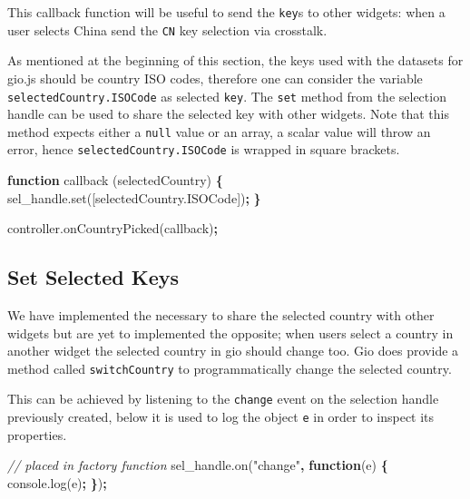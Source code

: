 \documentclass[
]{krantz}
\makeatletter
\newenvironment{Shaded}{\begin{snugshade}}{\end{snugshade}}
\newcommand{\AttributeTok}[1]{\textcolor[rgb]{0.61,0.61,0.61}{#1}}
\newcommand{\CommentTok}[1]{\textcolor[rgb]{0.37,0.37,0.37}{\textit{#1}}}
\newcommand{\KeywordTok}[1]{\textcolor[rgb]{0.27,0.27,0.27}{\textbf{#1}}}
\newcommand{\NormalTok}[1]{#1}
\newcommand{\OperatorTok}[1]{\textcolor[rgb]{0.43,0.43,0.43}{\textbf{#1}}}
\newcommand{\StringTok}[1]{\textcolor[rgb]{0.5,0.5,0.5}{#1}}
\newcommand{\VariableTok}[1]{\textcolor[rgb]{0,0,0}{#1}}
\newenvironment{kframe}{%
\medskip{}
\setlength{\fboxsep}{.8em}
 \def\at@end@of@kframe{}%
 \ifinner\ifhmode%
  \def\at@end@of@kframe{\end{minipage}}%
  \begin{minipage}{\columnwidth}%
 \fi\fi%
 \def\FrameCommand##1{\hskip\@totalleftmargin \hskip-\fboxsep
 \colorbox{shadecolor}{##1}\hskip-\fboxsep
     \hskip-\linewidth \hskip-\@totalleftmargin \hskip\columnwidth}%
 \MakeFramed {\advance\hsize-\width
   \@totalleftmargin\z@ \linewidth\hsize
   \@setminipage}}%
 {\par\unskip\endMakeFramed%
 \at@end@of@kframe}
\renewenvironment{Shaded}{\begin{kframe}}{\end{kframe}}
\makeatother
\begin{document}
This callback function will be useful to send the \texttt{key}s to other widgets: when a user selects China send the \texttt{CN} key selection via crosstalk.

As mentioned at the beginning of this section, the keys used with the datasets for gio.js should be country ISO codes, therefore one can consider the variable \texttt{selectedCountry.ISOCode} as selected \texttt{key}. The \texttt{set} method from the selection handle can be used to share the selected key with other widgets. Note that this method expects either a \texttt{null} value or an array, a scalar value will throw an error, hence \texttt{selectedCountry.ISOCode} is wrapped in square brackets.

\begin{Shaded}
\begin{Highlighting}[]
\KeywordTok{function} \AttributeTok{callback}\NormalTok{ (selectedCountry) }\OperatorTok{\{}
  \VariableTok{sel\_handle}\NormalTok{.}\AttributeTok{set}\NormalTok{([}\VariableTok{selectedCountry}\NormalTok{.}\AttributeTok{ISOCode}\NormalTok{])}\OperatorTok{;}
\OperatorTok{\}}

\VariableTok{controller}\NormalTok{.}\AttributeTok{onCountryPicked}\NormalTok{(callback)}\OperatorTok{;}
\end{Highlighting}
\end{Shaded}

\hypertarget{linking-widgets-set-keys}{%
\subsection{Set Selected Keys}\label{linking-widgets-set-keys}}

We have implemented the necessary to share the selected country with other widgets but are yet to implemented the opposite; when users select a country in another widget the selected country in gio should change too. Gio does provide a method called \texttt{switchCountry} to programmatically change the selected country.

This can be achieved by listening to the \texttt{change} event on the selection handle previously created, below it is used to log the object \texttt{e} in order to inspect its properties.

\begin{Shaded}
\begin{Highlighting}[]
\CommentTok{// placed in factory function}
\VariableTok{sel\_handle}\NormalTok{.}\AttributeTok{on}\NormalTok{(}\StringTok{"change"}\OperatorTok{,} \KeywordTok{function}\NormalTok{(e) }\OperatorTok{\{}
  \VariableTok{console}\NormalTok{.}\AttributeTok{log}\NormalTok{(e)}\OperatorTok{;}
\OperatorTok{\}}\NormalTok{)}\OperatorTok{;}
\end{Highlighting}
\end{Shaded}
\end{document}
